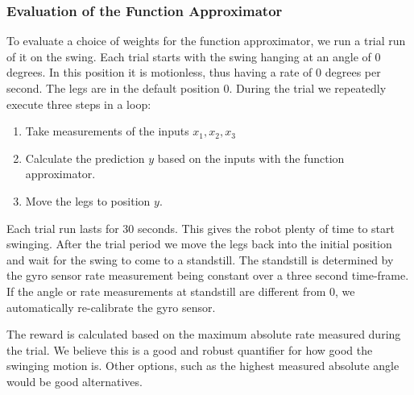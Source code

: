 \documentclass[11pt, a4paper]{article}
\begin{document}
	\subsubsection*{Evaluation of the Function Approximator}
	To evaluate a choice of weights for the function approximator, we run a trial run of it on the swing. Each trial starts with the swing hanging at an angle of $0$ degrees. In this position it is motionless, thus having a rate of $0$ degrees per second. The legs are in the default position $0$. During the trial we repeatedly execute three steps in a loop:
	\begin{enumerate}
		\item Take measurements of the inputs $x_1, x_2, x_3$
		\item Calculate the prediction $y$ based on the inputs with the function approximator.
		\item Move the legs to position $y$.
	\end{enumerate}
	Each trial run lasts for 30 seconds. This gives the robot plenty of time to start swinging. After the trial period we move the legs back into the initial position and wait for the swing to come to a standstill. The standstill is determined by the gyro sensor rate measurement being constant over a three second time-frame. If the angle or rate measurements at standstill are different from $0$, we automatically re-calibrate the gyro sensor.
	
	The reward is calculated based on the maximum absolute rate measured during the trial. We believe this is a good and robust quantifier for how good the swinging motion is. Other options, such as the highest measured absolute angle would be good alternatives.
	
\end{document}
